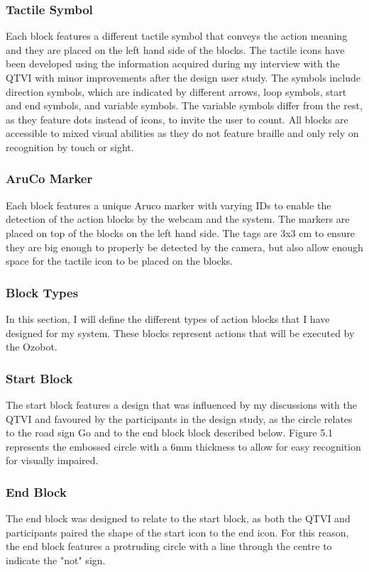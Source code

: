 \documentclass[oneside,%
                    author={Malak Hajji},
                    degree={BSc},
                    title={Designing An Accessible Computational Toolkit For Students},
                  subtitle={With Mixed Visual Abilities}]{dissertation}
\begin{document}
\subsubsection{Tactile Symbol}
Each block features a different tactile symbol that conveys the action meaning and they are placed on the left hand side of the blocks. The tactile icons have been developed using the information acquired during my interview with the QTVI with minor improvements after the design user study. The symbols include direction symbols, which are indicated by different arrows, loop symbols, start and end symbols, and variable symbols. The variable symbols differ from the rest, as they feature dots instead of icons, to invite the user to count.  All blocks are accessible to mixed visual abilities as they do not feature braille and only rely on recognition by touch or sight.

\subsubsection{AruCo Marker}
Each block features a unique Aruco marker with varying IDs to enable the detection of the action blocks by the webcam and the system. The markers are placed on top of the blocks on the left hand side. The tags are 3x3 cm to ensure they are big enough to properly be detected by the camera, but also allow enough space for the tactile icon to be placed on the blocks.
\subsubsection{Block Types}
In this section, I will define the different types of action blocks that I have designed for my system. These blocks represent actions that will be executed by the Ozobot.
\subsubsection{Start Block}
The start block features a design that was influenced by my discussions with the QTVI and favoured by the participants in the design study, as the circle relates to the road sign Go and to the end block block described below. Figure 5.1 represents the embossed circle with a 6mm thickness to allow for easy recognition for visually impaired. 

\subsubsection{End Block}
The end block was designed to relate to the start block, as both the QTVI and participants paired the shape of the start icon to the end icon. For this reason, the end block features a protruding circle with a line through the centre to indicate the "not" sign.
\end{document}
